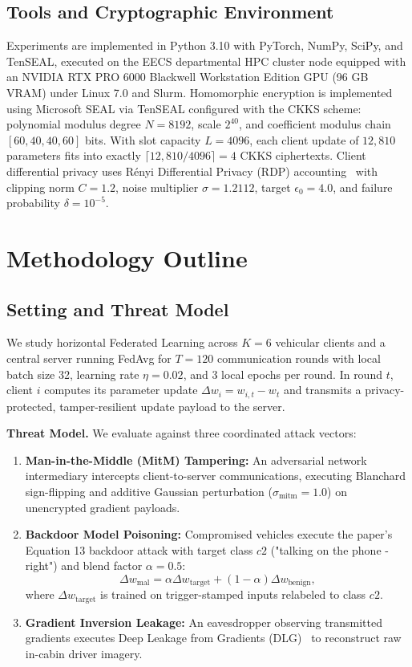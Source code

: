 \documentclass[acmtog,nonacm]{acmart}
\begin{document}
\subsection{Tools and Cryptographic Environment}
Experiments are implemented in Python 3.10 with PyTorch, NumPy, SciPy, and TenSEAL, executed on the EECS departmental HPC cluster node equipped with an NVIDIA RTX PRO 6000 Blackwell Workstation Edition GPU (96 GB VRAM) under Linux 7.0 and Slurm. Homomorphic encryption is implemented using Microsoft SEAL via TenSEAL configured with the CKKS scheme: polynomial modulus degree $N = 8192$, scale $2^{40}$, and coefficient modulus chain $[60, 40, 40, 60]$ bits. With slot capacity $L = 4096$, each client update of $12{,}810$ parameters fits into exactly $\lceil 12{,}810 / 4096 \rceil = 4$ CKKS ciphertexts. Client differential privacy uses Rényi Differential Privacy (RDP) accounting~\cite{balle2018improving} with clipping norm $C = 1.2$, noise multiplier $\sigma = 1.2112$, target $\epsilon_0 = 4.0$, and failure probability $\delta = 10^{-5}$.

\section{Methodology Outline}
\label{sec:methodology}

\subsection{Setting and Threat Model}
We study horizontal Federated Learning across $K = 6$ vehicular clients and a central server running FedAvg for $T = 120$ communication rounds with local batch size 32, learning rate $\eta = 0.02$, and 3 local epochs per round. In round $t$, client $i$ computes its parameter update $\Delta w_i = w_{i,t} - w_t$ and transmits a privacy-protected, tamper-resilient update payload to the server.

\textbf{Threat Model.} We evaluate against three coordinated attack vectors:
\begin{enumerate}
    \item \textbf{Man-in-the-Middle (MitM) Tampering:} An adversarial network intermediary intercepts client-to-server communications, executing Blanchard sign-flipping and additive Gaussian perturbation ($\sigma_{\text{mitm}} = 1.0$) on unencrypted gradient payloads.
    \item \textbf{Backdoor Model Poisoning:} Compromised vehicles execute the paper's Equation 13 backdoor attack with target class $c2$ ("talking on the phone - right") and blend factor $\alpha = 0.5$:
    \begin{equation}
    \Delta w_{\text{mal}} = \alpha \Delta w_{\text{target}} + (1 - \alpha) \Delta w_{\text{benign}},
    \end{equation}
    where $\Delta w_{\text{target}}$ is trained on trigger-stamped inputs relabeled to class $c2$.
    \item \textbf{Gradient Inversion Leakage:} An eavesdropper observing transmitted gradients executes Deep Leakage from Gradients (DLG)~\cite{du2024sok} to reconstruct raw in-cabin driver imagery.
\end{enumerate}
\end{document}
